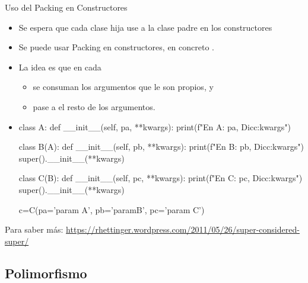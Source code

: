 \documentclass[10pt,envcountsect,spanish]{beamer}
\begin{document}
\begin{frame}[fragile]{Uso del Packing en Constructores}
\small
\begin{itemize}
\item Se espera que cada clase hija use  a la clase padre en los constructores
\item Se puede usar Packing en constructores, en concreto .
\item La idea es que en cada 
	\begin{itemize}
	\item se consuman los argumentos que le son propios, y 
	\item pase a  el resto de los argumentos.
	\end{itemize}

\item[] \unEjemplo \tiny

\hfil \begin{minipage}{.5\textwidth}
\begin{pyconsole}[][frame=single]
class A:
    def __init__(self, pa, **kwargs):
        print(f"En A: {pa}, Dicc:{kwargs}")

class B(A):
    def __init__(self, pb, **kwargs):
        print(f"En B: {pb}, Dicc:{kwargs}")
        super().__init__(**kwargs)

class C(B):
    def __init__(self, pc, **kwargs):
        print(f"En C: {pc}, Dicc:{kwargs}")
        super().__init__(**kwargs)

c=C(pa='param A', pb='paramB', pc='param C')
\end{pyconsole}
\end{minipage} 
\end{itemize}
\scriptsize Para saber más: \url{https://rhettinger.wordpress.com/2011/05/26/super-considered-super/}
\end{frame}








\subsection{Polimorfismo}
\end{document}
